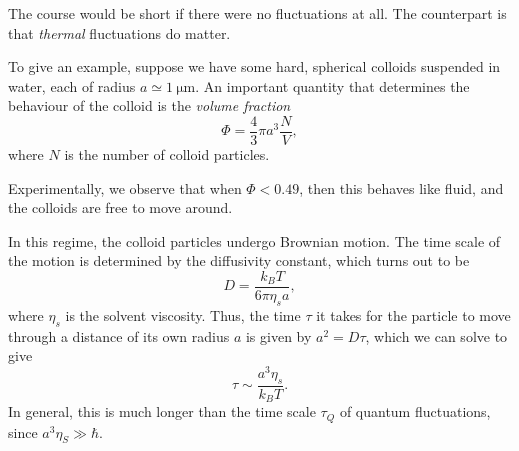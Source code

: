 \documentclass[a4paper]{article}
\begin{document}
The course would be short if there were no fluctuations at all. The counterpart is that \emph{thermal} fluctuations do matter.

To give an example, suppose we have some hard, spherical colloids suspended in water, each of radius $a \simeq \SI{1}{\micro\meter}$. An important quantity that determines the behaviour of the colloid is the \emph{volume fraction}
\[
  \Phi = \frac{4}{3} \pi a^3 \frac{N}{V},
\]
where $N$ is the number of colloid particles.

Experimentally, we observe that when $\Phi < 0.49$, then this behaves like fluid, and the colloids are free to move around.
\begin{center}
\end{center}
In this regime, the colloid particles undergo Brownian motion. The time scale of the motion is determined by the diffusivity constant, which turns out to be
\[
  D = \frac{k_B T}{6 \pi \eta_s a},
\]
where $\eta_s$ is the solvent viscosity. Thus, the time $\tau$ it takes for the particle to move through a distance of its own radius $a$ is given by $a^2 = D \tau$, which we can solve to give
\[
  \tau \sim \frac{a^3 \eta_s}{ k_B T}.
\]
In general, this is much longer than the time scale $\tau_Q$ of quantum fluctuations, since $a^3 \eta_S \gg \hbar$.
\end{document}
